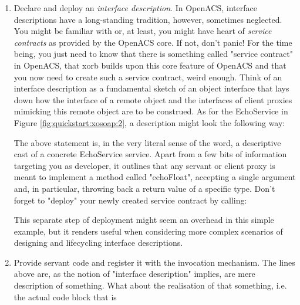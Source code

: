   \begin{enumerate}
  \item Declare and deploy an \emph{interface description}. In
    OpenACS, interface descriptions have a long-standing tradition,
    however, sometimes neglected. You might be familiar with or, at least,
    you might have heart of \emph{service contracts} as provided by the
    OpenACS core. If not, don't panic! For the time being, you just need
    to know that there is something called "service contract" in OpenACS,
    that xorb builds upon this core feature of OpenACS and that you now
    need to create such a service contract, weird enough. Think of an
    interface description as a fundamental sketch of an object interface
    that lays down how the interface of a remote object and the interfaces
    of client proxies mimicking this remote object are to be construed. As
    for the EchoService in Figure \ref{fig:quickstart:xosoap:2}, a
    description might look the following way:
    \lstset{breaklines=true,numbers=left,basicstyle=\footnotesize,frame=single}
    
    The above statement is, in the very literal sense of the word, a
    descriptive cast of a concrete EchoService service. Apart from a few
    bits of information targeting you as developer, it outlines that any
    servant or client proxy is meant to implement a method called
    "echoFloat", accepting a single argument and, in particular, throwing
    back a return value of a specific type. Don't forget to "deploy" your
    newly created service contract by calling:
    
    This separate step of deployment might seem an overhead in this simple
    example, but it renders useful when considering more complex scenarios
    of designing and lifecycling interface descriptions.
  \item Provide servant code and register it with the invocation
    mechanism. The lines above are, as the notion of "interface
    description" implies, are mere description of something. What about
    the realisation of that something, i.e. the actual code block that is

\end{enumerate}
